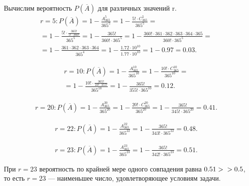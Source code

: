 \documentclass{book}
\begin{document}
Вычислим вероятность $ P \left( \overline{A} \right) $ для различных значений r.
\begin{equation*}
\begin{split}
r = 5 : P \left( \overline{A} \right) =
1 - \frac{A_{365}^5}{365^5} =
1 - \frac{5! \cdot C_{365}^5}{365^5} = \\
= 1 - \frac{5! \cdot \frac{365!}{5! \cdot 360!} }{365^5} =
1 - \frac{365!}{360! \cdot 365^5} =
1 - \frac{360! \cdot 361 \cdot 362 \cdot 363 \cdot 364 \cdot 365}{360! \cdot 365^5} = \\
= 1 - \frac{361 \cdot 362 \cdot 363 \cdot 364}{365^4} =
1 - \frac{1.72 \cdot 10^10}{1.77 \cdot 10^10} =
1 - 0.97 =
0.03.
\end{split}
\end{equation*}

\begin{equation*}
\begin{split}
r = 10 :
P \left( \overline{A} \right) =
1 - \frac{A_{365}^{10}}{365^{10}} =
1- \frac{10! \cdot C_{365}^{10}}{365^{10}} = \\
= 1 - \frac{10! \cdot \frac{365!}{10! \cdot 355!}}{365^{10}} =
1 - \frac{365!}{355! \cdot 365^{10}} =
0.12.
\end{split}
\end{equation*}

\begin{equation*}
\begin{split}
r = 20 :
P \left( \overline{A} \right) =
1 - \frac{A_{365}^{20}}{365^{20}} =
1 - \frac{20! \cdot C_{365}^{20}}{365^{20}} =
1 - \frac{365!}{345! \cdot 365^{20}} =
0.41.
\end{split}
\end{equation*}

\begin{equation*}
\begin{split}
r = 22 :
P \left( \overline{A} \right) =
1 - \frac{A_{365}^{22}}{365^{22}} =
1 - \frac{365!}{343! \cdot 365^{22}} =
0.48.
\end{split}
\end{equation*}

\begin{equation*}
\begin{split}
r = 23 :
P \left( \overline{A} \right) =
1 - \frac{A_{365}^{23}}{365^{23}} =
1 - \frac{365!}{342! \cdot 365^{23}} =
0.51.
\end{split}
\end{equation*}

При
$ r = 23 $
вероятность по крайней мере одного совпадения равна
$ 0.51 > \\
> 0.5 $,
то есть
$ r = 23 $ ---
наименьшее число, удовлетворяющее условиям задачи.
\end{document}
